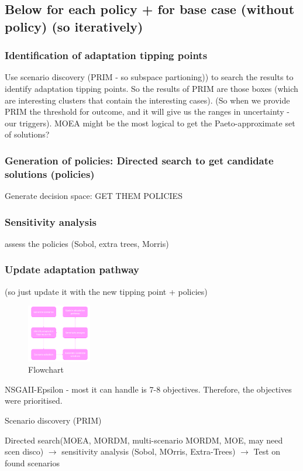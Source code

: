 \subsection{Below for each policy + for base case (without policy) (so iteratively)}
\subsubsection{Identification of adaptation tipping points}
Use scenario discovery (PRIM - so subspace partioning)) to search the results to identify adaptation tipping points. So the results of PRIM are those boxes (which are interesting clusters that contain the interesting cases). (So when we provide PRIM the threshold for outcome, and it will give us the ranges in uncertainty - our triggers).
MOEA might be the most logical to get the Paeto-approximate set of solutions?

\subsubsection{Generation of policies: Directed search to get candidate solutions (policies)}
Generate decision space: GET THEM POLICIES

\subsubsection{Sensitivity analysis}
assess the policies (Sobol, extra trees, Morris)

\subsubsection{Update adaptation pathway}
(so just update it with the new tipping point + policies)


\begin{figure}[h!]
    \centering
    \includegraphics[width=0.25\textwidth]{report/figures/flowchart.png} 
    \caption{Flowchart}
    \label{fig:flowchart}
\end{figure}

\hline




NSGAII-Epsilon - most it can handle is 7-8 objectives. Therefore, the objectives were prioritised.

Scenario discovery (PRIM)

Directed search(MOEA, MORDM, multi-scenario MORDM, MOE, may need scen disco) $\xrightarrow{}$ sensitivity analysis (Sobol, MOrris, Extra-Trees) $\xrightarrow{}$ Test on found scenarios


